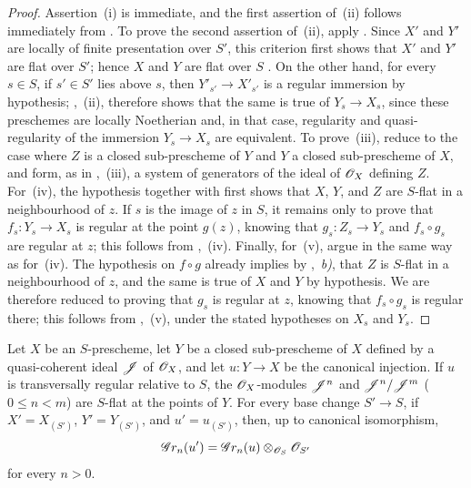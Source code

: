 \begin{proof}
Assertion~(i) is immediate, and the first assertion of~(ii) follows immediately from .
To prove the second assertion of~(ii), apply . Since $X'$ and $Y'$ are locally of finite presentation over $S'$, this criterion first shows that $X'$ and $Y'$ are flat over $S'$; hence $X$ and $Y$ are flat over $S$ . On the other hand, for every $s\in S$, if $s'\in S'$ lies above $s$, then $Y'_{s'}\to X'_{s'}$ is a regular immersion by hypothesis; ,~(ii), therefore shows that the same is true of $Y_s\to X_s$, since these preschemes are locally Noetherian and, in that case, regularity and quasi-regularity of the immersion $Y_s\to X_s$ are equivalent.
To prove~(iii), reduce to the case where $Z$ is a closed sub-prescheme of $Y$ and $Y$ a closed sub-prescheme of $X$, and form, as in ,~(iii), a system of generators of the ideal of $\mathscr{O}_X$ defining $Z$.
For~(iv), the hypothesis together with  first shows that $X$, $Y$, and $Z$ are $S$-flat in a neighbourhood of $z$. If $s$ is the image of $z$ in $S$, it remains only to prove that $f_s:Y_s\to X_s$ is regular at the point $g(z)$, knowing that $g_s:Z_s\to Y_s$ and $f_s\circ g_s$ are regular at $z$; this follows from ,~(iv).
Finally, for~(v), argue in the same way as for~(iv). The hypothesis on $f\circ g$ already implies by ,~\emph{b)}, that $Z$ is $S$-flat in a neighbourhood of $z$, and the same is true of $X$ and $Y$ by hypothesis. We are therefore reduced to proving that $g_s$ is regular at $z$, knowing that $f_s\circ g_s$ is regular there; this follows from ,~(v), under the stated hypotheses on $X_s$ and $Y_s$.
\end{proof}


\begin{proposition}[19.2.8]
\label{IV.19.2.8}
Let $X$ be an $S$-prescheme, let $Y$ be a closed sub-prescheme of $X$ defined by a quasi-coherent ideal $\mathscr{J}$ of $\mathscr{O}_X$, and let $u:Y\to X$ be the canonical injection.
If $u$ is transversally regular relative to $S$, the $\mathscr{O}_X$-modules $\mathscr{J}^n$ and $\mathscr{J}^n/\mathscr{J}^m$ \textup{(}$0\leq n<m$\textup{)} are $S$-flat at the points of $Y$.
For every base change $S'\to S$, if $X'=X_{(S')}$, $Y'=Y_{(S')}$, and $u'=u_{(S')}$, then, up to canonical isomorphism,
\[
  \mathscr{G}r_n(u')=\mathscr{G}r_n(u)\otimes_{\mathscr{O}_S}\mathscr{O}_{S'}
\]
for every $n>0$.
\end{proposition}

